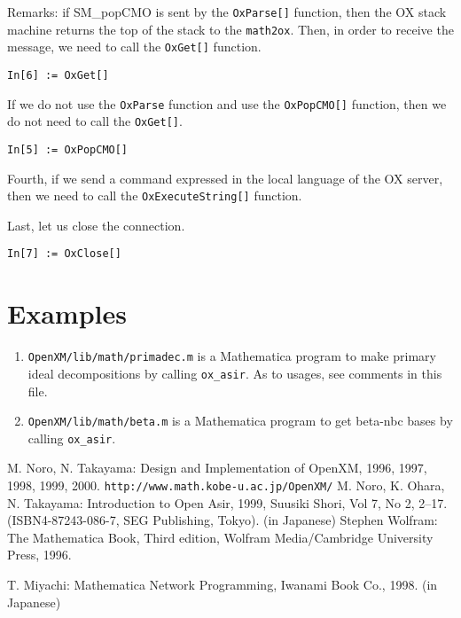 \documentclass{article}
\begin{document}
Remarks: if SM\_popCMO is sent by the {\tt OxParse[]} function, then the
OX stack machine returns the top of the stack to the {\tt math2ox}.
Then, in order to receive the message, we need to call the {\tt OxGet[]}
function.
\begin{verbatim}
In[6] := OxGet[]
\end{verbatim}

If we do not use the {\tt OxParse} function and use the {\tt OxPopCMO[]}
function, then we do not need to call the {\tt OxGet[]}.
\begin{verbatim}
In[5] := OxPopCMO[]
\end{verbatim}

Fourth, if we send a command expressed in the local language of the OX
server, then we need to call the {\tt OxExecuteString[]} function.

Last, let us close the connection.
\begin{verbatim}
In[7] := OxClose[]
\end{verbatim}

\section{Examples}

\begin{enumerate}
\item
{\tt OpenXM/lib/math/primadec.m} is a Mathematica program
to make primary ideal decompositions by calling
{\tt ox\_asir}.
As to usages, see comments in this file.
\item 
{\tt OpenXM/lib/math/beta.m} is a Mathematica program
to get beta-nbc bases by calling {\tt ox\_asir}.
\end{enumerate}



\appendix

\begin{thebibliography}{99}
M. Noro, N. Takayama:
Design and Implementation of OpenXM, 1996, 1997, 1998, 1999, 2000.
{\footnotesize {\tt http://www.math.kobe-u.ac.jp/OpenXM/}}
M. Noro, K. Ohara, N. Takayama:
{Introduction to Open Asir}, 1999, Suusiki Shori, Vol 7, No 2,
2--17. (ISBN4-87243-086-7, SEG Publishing, Tokyo). (in Japanese)
Stephen Wolfram:
{The Mathematica Book}, Third edition,
Wolfram Media/Cambridge University Press, 1996.

T. Miyachi:
{Mathematica Network Programming},
Iwanami Book Co., 1998. (in Japanese)
\end{thebibliography}
\end{document}

